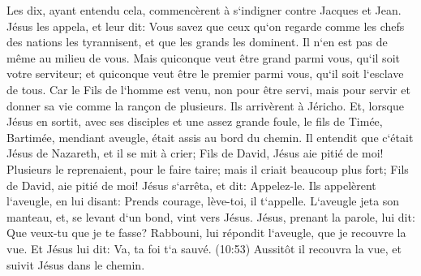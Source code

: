\verse Les dix, ayant entendu cela, commencèrent à s`indigner contre Jacques et Jean. 
\verse Jésus les appela, et leur dit: Vous savez que ceux qu`on regarde comme les chefs des nations les tyrannisent, et que les grands les dominent. 
\verse Il n`en est pas de même au milieu de vous. Mais quiconque veut être grand parmi vous, qu`il soit votre serviteur; 
\verse et quiconque veut être le premier parmi vous, qu`il soit l`esclave de tous. 
\verse Car le Fils de l`homme est venu, non pour être servi, mais pour servir et donner sa vie comme la rançon de plusieurs. 
\verse Ils arrivèrent à Jéricho. Et, lorsque Jésus en sortit, avec ses disciples et une assez grande foule, le fils de Timée, Bartimée, mendiant aveugle, était assis au bord du chemin. 
\verse Il entendit que c`était Jésus de Nazareth, et il se mit à crier; Fils de David, Jésus aie pitié de moi! 
\verse Plusieurs le reprenaient, pour le faire taire; mais il criait beaucoup plus fort; Fils de David, aie pitié de moi! 
\verse Jésus s`arrêta, et dit: Appelez-le. Ils appelèrent l`aveugle, en lui disant: Prends courage, lève-toi, il t`appelle. 
\verse L`aveugle jeta son manteau, et, se levant d`un bond, vint vers Jésus. 
\verse Jésus, prenant la parole, lui dit: Que veux-tu que je te fasse? Rabbouni, lui répondit l`aveugle, que je recouvre la vue. 
\verse Et Jésus lui dit: Va, ta foi t`a sauvé. (10:53) Aussitôt il recouvra la vue, et suivit Jésus dans le chemin. 


